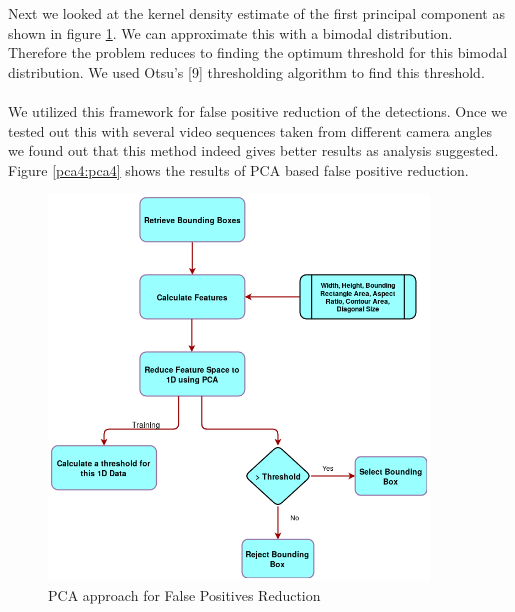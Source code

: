 \documentclass[12pt,a4paper]{report}
\begin{document}
Next we looked at the kernel density estimate of the first principal component as shown in figure \ref{pca3}. We can approximate this with a bimodal distribution. Therefore the problem reduces to finding the optimum threshold for this bimodal distribution. We used Otsu’s [9] thresholding algorithm to find this threshold.
\\\\
We utilized this framework for false positive reduction of the detections. Once we tested out this with several video sequences taken from different camera angles we found out that this method indeed gives better results as analysis suggested. Figure \ref{pca4:pca4} shows the results of PCA based false positive reduction.\\
\begin{figure}[H]
\includegraphics[width=0.9\textwidth]{pca_flow.png}
\centering
\caption{PCA approach for False Positives Reduction}
\label{pca3}
\end{figure}
\end{document}
